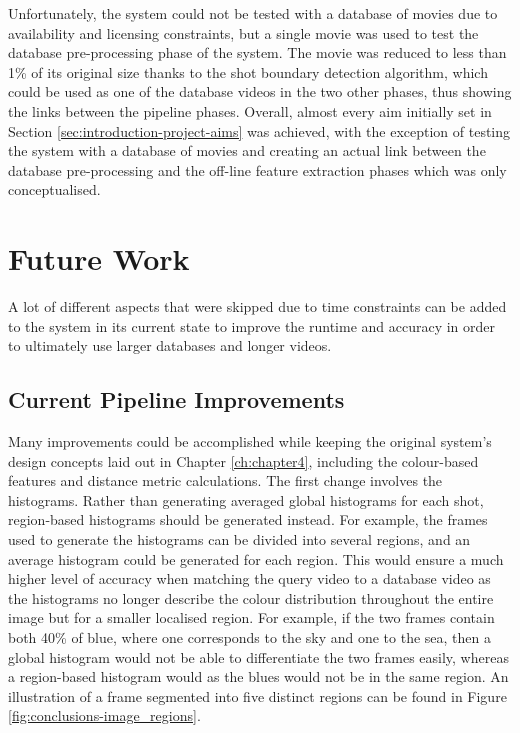 Unfortunately, the system could not be tested with a database of movies due to availability and licensing constraints, but a single movie was used to test the database pre-processing phase of the system. The movie was reduced to less than 1\% of its original size thanks to the shot boundary detection algorithm, which could be used as one of the database videos in the two other phases, thus showing the links between the pipeline phases. Overall, almost every aim initially set in Section \ref{sec:introduction-project-aims} was achieved, with the exception of testing the system with a database of movies and creating an actual link between the database pre-processing and the off-line feature extraction phases which was only conceptualised.
    

\section{Future Work}

A lot of different aspects that were skipped due to time constraints can be added to the system in its current state to improve the runtime and accuracy in order to ultimately use larger databases and longer videos.

\subsection{Current Pipeline Improvements}

Many improvements could be accomplished while keeping the original system's design concepts laid out in Chapter \ref{ch:chapter4}, including the colour-based features and distance metric calculations. The first change involves the histograms. Rather than generating averaged global histograms for each shot, region-based histograms should be generated instead. For example, the frames used to generate the histograms can be divided into several regions, and an average histogram could be generated for each region. This would ensure a much higher level of accuracy when matching the query video to a database video as the histograms no longer describe the colour distribution throughout the entire image but for a smaller localised region. For example, if the two frames contain both 40\% of blue, where one corresponds to the sky and one to the sea, then a global histogram would not be able to differentiate the two frames easily, whereas a region-based histogram would as the blues would not be in the same region. An illustration of a frame segmented into five distinct regions can be found in Figure \ref{fig:conclusions-image_regions}.\\

